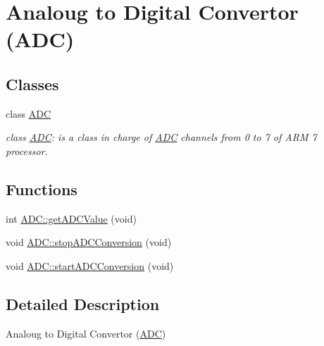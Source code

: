 \hypertarget{group__group5}{
\section{Analoug to Digital Convertor (ADC)}
\label{dc/d9a/group__group5}
}
\subsection*{Classes}
\begin{DoxyCompactItemize}
\item 
class \hyperlink{class_a_d_c}{ADC}
\begin{DoxyCompactList}\small\item\em class \hyperlink{class_a_d_c}{ADC}: is a class in charge of \hyperlink{class_a_d_c}{ADC} channels from 0 to 7 of ARM 7 processor. \end{DoxyCompactList}\end{DoxyCompactItemize}
\subsection*{Functions}
\begin{DoxyCompactItemize}
\item 
int \hyperlink{group__group5_gad8b2af8332757e9ac4e54b8aed5c874f}{ADC::getADCValue} (void)
\item 
void \hyperlink{group__group5_ga863274d7f0e3450c4ae52eadc397bea5}{ADC::stopADCConversion} (void)
\item 
void \hyperlink{group__group5_gae5f6a9de2dcd638d16f5054a8e0eb29f}{ADC::startADCConversion} (void)
\end{DoxyCompactItemize}


\subsection{Detailed Description}
Analoug to Digital Convertor (\hyperlink{class_a_d_c}{ADC}) 

